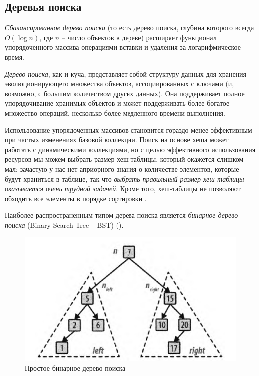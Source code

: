 \documentclass[%
	11pt,
	a4paper,
	utf8,
		]{article}
\begin{document}
\subsection{Деревья поиска}

\emph{Сбалансированное дерево поиска} (то есть дерево поиска, глубина которого всегда $ O(\log n) $, где $ n $ -- число объектов в дереве) расширяет функционал упорядоченного массива операциями вставки и удаления за логарифмическое время.

\emph{Дерево поиска}, как и куча, представляет собой структуру данных для хранения эволюционирующего множества объектов, ассоциированных с ключами (и, возможно, с большим количеством других данных). Она поддерживает полное упорядочивание хранимых объектов и может поддерживать более богатое множество операций, несколько более медленного времени выполнения.

Использование упорядоченных массивов становится гораздо менее эффективным при частых изменениях базовой коллекции. Поиск на основе хеша может работать с динамическими коллекциями, но с целью эффективного использования ресурсов мы можем выбрать размер хеш-таблицы, который окажется слишком мал; зачастую у нас нет априорного знания о количестве элементов, которые будут храниться в таблице, так что \emph{\color{red}выбрать правильный размер хеш-таблицы оказывается очень трудной задачей}. Кроме того, хеш-таблицы не позволяют обходить все элементы в порядке сортировки \cite[]{heineman:2017}.

Наиболее распространенным типом дерева поиска является \emph{бинарное дерево поиска} (Binary Search Tree -- BST) ().

\begin{figure}[h]
	\centering
	\includegraphics[scale=0.65]{figures/BST.png}
	\caption{ Простое бинарное дерево поиска }\label{fig:BST}
\end{figure}
\end{document}
